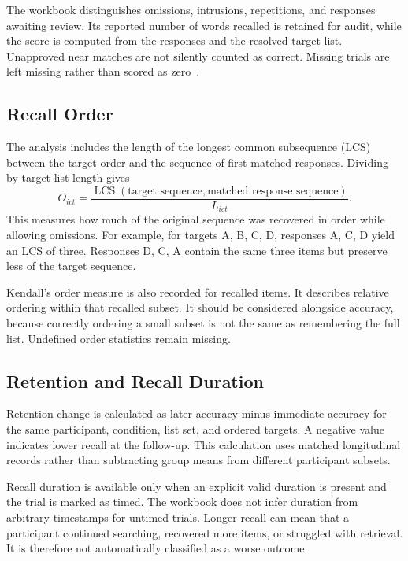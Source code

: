 The workbook distinguishes omissions, intrusions, repetitions, and responses awaiting review. Its reported number of words recalled is retained for audit, while the score is computed from the responses and the resolved target list. Unapproved near matches are not silently counted as correct. Missing trials are left missing rather than scored as zero~\cite{srooranalysis}.

\subsection{Recall Order}
The analysis includes the length of the longest common subsequence (LCS) between the target order and the sequence of first matched responses. Dividing by target-list length gives
\begin{equation}
O_{ict}=\frac{\operatorname{LCS}(\text{target sequence},\text{matched response sequence})}{L_{ict}}.
\end{equation}
This measures how much of the original sequence was recovered in order while allowing omissions. For example, for targets A, B, C, D, responses A, C, D yield an LCS of three. Responses D, C, A contain the same three items but preserve less of the target sequence.

Kendall's order measure is also recorded for recalled items. It describes relative ordering within that recalled subset. It should be considered alongside accuracy, because correctly ordering a small subset is not the same as remembering the full list. Undefined order statistics remain missing.

\subsection{Retention and Recall Duration}
Retention change is calculated as later accuracy minus immediate accuracy for the same participant, condition, list set, and ordered targets. A negative value indicates lower recall at the follow-up. This calculation uses matched longitudinal records rather than subtracting group means from different participant subsets.

Recall duration is available only when an explicit valid duration is present and the trial is marked as timed. The workbook does not infer duration from arbitrary timestamps for untimed trials. Longer recall can mean that a participant continued searching, recovered more items, or struggled with retrieval. It is therefore not automatically classified as a worse outcome.

